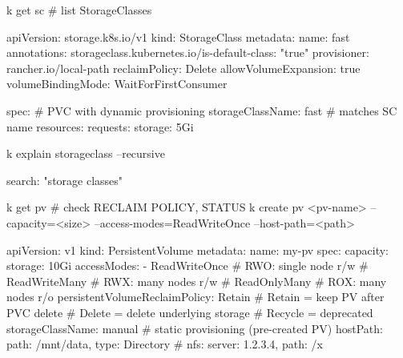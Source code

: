 \begin{tcbitemize}[
  raster columns=2, raster equal height=rows,
  blanker, cheat subtitle
]
\begin{tcbitemize}[
      raster columns=1, raster equal height=rows,
      blanker, cheat subtitle
    ]
        \begin{cheatcodebash}
        k get sc               # list StorageClasses
        \end{cheatcodebash}
        \begin{cheatcodebash}
        apiVersion: storage.k8s.io/v1
        kind: StorageClass
        metadata:
          name: fast
          annotations:
            storageclass.kubernetes.io/is-default-class: "true"
        provisioner: rancher.io/local-path
        reclaimPolicy: Delete
        allowVolumeExpansion: true
        volumeBindingMode: WaitForFirstConsumer
        \end{cheatcodebash}
        \begin{cheatcodebash}
        spec:  # PVC with dynamic provisioning
          storageClassName: fast  # matches SC name
          resources:
            requests: {storage: 5Gi}
        \end{cheatcodebash}

        \begin{cheatcodebash}
        k explain storageclass --recursive
        \end{cheatcodebash}
        \begin{cheatcodebash}
        search: "storage classes"
        \end{cheatcodebash}


      \tcbitem

        \begin{cheatcodebashbold}
        k get pv    # check RECLAIM POLICY, STATUS
        k create pv <pv-name> --capacity=<size> --access-modes=ReadWriteOnce --host-path=<path>
        \end{cheatcodebashbold}

        \begin{cheatcodebash}
        apiVersion: v1
        kind: PersistentVolume
        metadata: {name: my-pv}
        spec:
          capacity: {storage: 10Gi}
          accessModes:
          - ReadWriteOnce   # RWO: single node r/w
          # ReadWriteMany   # RWX: many nodes r/w
          # ReadOnlyMany    # ROX: many nodes r/o
          persistentVolumeReclaimPolicy: Retain
          # Retain   = keep PV after PVC delete
          # Delete   = delete underlying storage
          # Recycle  = deprecated
          storageClassName: manual  # static provisioning (pre-created PV)
          hostPath: {path: /mnt/data, type: Directory}
        # nfs: {server: 1.2.3.4, path: /x}
        \end{cheatcodebash}


\end{tcbitemize}
\end{tcbitemize}

